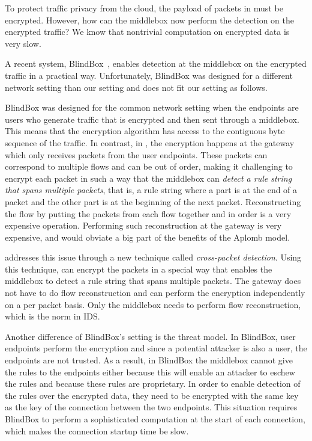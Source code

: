 To protect traffic privacy from the cloud, the payload of packets in \sys must be encrypted. 
However, how can the middlebox now perform the detection on the encrypted traffic? 
We know that nontrivial computation on encrypted data is very slow. ~\cite{CITE}

A recent system, BlindBox~\cite{blindbox},  enables detection at the middlebox on the encrypted traffic
in a practical way. 
Unfortunately, BlindBox was designed for a different network setting than our setting 
and does not fit our setting  as follows.


BlindBox was designed for the common network setting when the endpoints are users who generate
traffic that is encrypted and then sent through a middlebox. This means that the encryption algorithm
has access to the contiguous byte sequence of the traffic. In contrast, in \sys, the encryption 
happens at the gateway 
which only receives packets from the user endpoints. 
These packets can correspond to multiple flows and can be out of order, 
making it challenging to encrypt each packet in such a way that the middlebox can  {\em detect 
a rule string that spans multiple packets}, that is, a rule string where a part is at the end of a packet and the other part is at the beginning of the next packet.  Reconstructing the flow by putting the packets from each flow together and in order  is a very expensive 
operation. Performing such reconstruction at the gateway is 
very expensive, and would obviate a big part of the benefits of the Aplomb model. 


\sys addresses this issue through a new technique called {\em cross-packet detection}. Using this technique,
\sys can encrypt the packets in a special way that enables the middlebox to detect a rule string that spans multiple
packets. The gateway does not have to do flow reconstruction and can perform the encryption 
independently on a per packet basis. Only the middlebox
needs to perform flow reconstruction, which is the norm in IDS. 


Another difference of BlindBox's setting is the threat model. In BlindBox, user
endpoints perform the encryption and since a potential attacker is also a user, 
the endpoints are not trusted. As a result, in BlindBox the middlebox cannot
give the rules to the endpoints either because this will enable an attacker to eschew the
rules and because these rules are proprietary. In order to enable detection of the rules
over the encrypted data, they need to be encrypted with the same key as the 
key of the connection between the two endpoints. This situation requires BlindBox to perform
a sophisticated computation at the start of each connection, which makes the connection
startup time be slow. 


